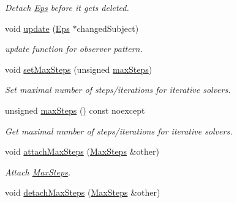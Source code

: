 \begin{DoxyCompactItemize}
\begin{DoxyCompactList}\small\item\em Detach \hyperlink{classSpacy_1_1Mixin_1_1Eps}{Eps} before it gets deleted. \end{DoxyCompactList}\item 
\hypertarget{classSpacy_1_1Mixin_1_1Eps_a151216968daef3da5f5cdc0b957ce01b}{}void \hyperlink{classSpacy_1_1Mixin_1_1Eps_a151216968daef3da5f5cdc0b957ce01b}{update} (\hyperlink{classSpacy_1_1Mixin_1_1Eps_a51dbe0b9cc950e0f3dfd34a481f08ae4_a51dbe0b9cc950e0f3dfd34a481f08ae4}{Eps} $\ast$changed\+Subject)\label{classSpacy_1_1Mixin_1_1Eps_a151216968daef3da5f5cdc0b957ce01b}

\begin{DoxyCompactList}\small\item\em update function for observer pattern. \end{DoxyCompactList}\item 
void \hyperlink{classSpacy_1_1Mixin_1_1MaxSteps_a72f0b7eb50c9a017b5f5e6c2ccf7dfd9_a72f0b7eb50c9a017b5f5e6c2ccf7dfd9}{set\+Max\+Steps} (unsigned \hyperlink{classSpacy_1_1Mixin_1_1MaxSteps_aaeb0b209c78e7b8dd9b268641ce11977_aaeb0b209c78e7b8dd9b268641ce11977}{max\+Steps})
\begin{DoxyCompactList}\small\item\em Set maximal number of steps/iterations for iterative solvers. \end{DoxyCompactList}\item 
unsigned \hyperlink{classSpacy_1_1Mixin_1_1MaxSteps_aaeb0b209c78e7b8dd9b268641ce11977_aaeb0b209c78e7b8dd9b268641ce11977}{max\+Steps} () const noexcept
\begin{DoxyCompactList}\small\item\em Get maximal number of steps/iterations for iterative solvers. \end{DoxyCompactList}\item 
void \hyperlink{classSpacy_1_1Mixin_1_1MaxSteps_a8b093369a1ce5a6323f3dc3c41a738e6_a8b093369a1ce5a6323f3dc3c41a738e6}{attach\+Max\+Steps} (\hyperlink{classSpacy_1_1Mixin_1_1MaxSteps_a8e5d8290884bdc760147862d5b9644dc_a8e5d8290884bdc760147862d5b9644dc}{Max\+Steps} \&other)
\begin{DoxyCompactList}\small\item\em Attach \hyperlink{classSpacy_1_1Mixin_1_1MaxSteps}{Max\+Steps}. \end{DoxyCompactList}\item 
\hypertarget{classSpacy_1_1Mixin_1_1MaxSteps_ac16eca4cd967aed1856f072b08f4aabd}{}void \hyperlink{classSpacy_1_1Mixin_1_1MaxSteps_ac16eca4cd967aed1856f072b08f4aabd}{detach\+Max\+Steps} (\hyperlink{classSpacy_1_1Mixin_1_1MaxSteps_a8e5d8290884bdc760147862d5b9644dc_a8e5d8290884bdc760147862d5b9644dc}{Max\+Steps} \&other)\label{classSpacy_1_1Mixin_1_1MaxSteps_ac16eca4cd967aed1856f072b08f4aabd}


\end{DoxyCompactItemize}
